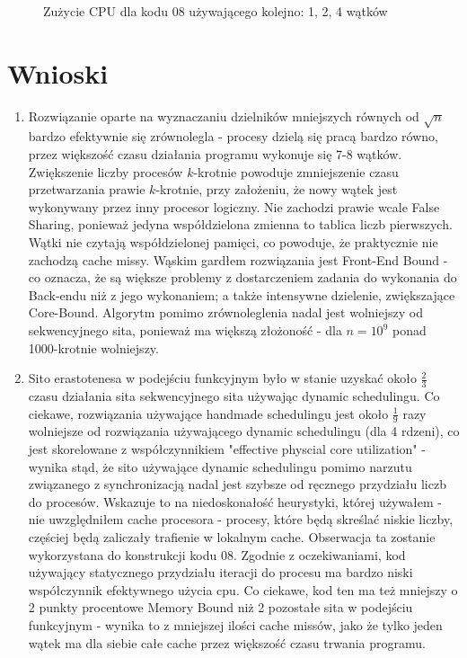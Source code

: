 \documentclass[12pt]{article}
\begin{document}
\begin{figure}[h!]
\begin{subfigure}[b]{0.32\linewidth}
	\end{subfigure}
	\caption{Zużycie CPU dla kodu 08 używającego kolejno: 1, 2, 4 wątków}
\end{figure}

\section{Wnioski}
\begin{enumerate}
	\item Rozwiązanie oparte na wyznaczaniu dzielników mniejszych równych od \(\sqrt{n}\) bardzo efektywnie się zrównolegla - procesy dzielą się pracą bardzo równo, przez większość czasu działania programu wykonuje się 7-8 wątków. Zwiększenie liczby procesów \(k\)-krotnie powoduje zmniejszenie czasu przetwarzania prawie \(k\)-krotnie, przy założeniu, że nowy wątek jest wykonywany przez inny procesor logiczny. Nie zachodzi prawie wcale False Sharing, ponieważ jedyna współdzielona zmienna to tablica liczb pierwszych. Wątki nie czytają współdzielonej pamięci, co powoduje, że praktycznie nie zachodzą cache missy. Wąskim gardłem rozwiązania jest Front-End Bound - co oznacza, że są większe problemy z dostarczeniem zadania do wykonania do Back-endu niż z jego wykonaniem; a także intensywne dzielenie, zwiększające Core-Bound. Algorytm pomimo zrównoleglenia nadal jest wolniejszy od sekwencyjnego sita, ponieważ ma większą złożoność - dla \(n=10^9\) ponad 1000-krotnie wolniejszy.
	
	\item Sito erastotenesa w podejściu funkcyjnym było w stanie uzyskać około \(\frac{2}{3}\) czasu działania sita sekwencyjnego sita używając dynamic schedulingu. Co ciekawe, rozwiązania używające handmade schedulingu jest około \(\frac{1}{9}\) razy wolniejsze od rozwiązania używającego dynamic schedulingu (dla 4 rdzeni), co jest skorelowane z współczynnikiem "effective physcial core utilization" - wynika stąd, że sito używające dynamic schedulingu pomimo narzutu związanego z synchronizacją nadal jest szybsze od ręcznego przydziału liczb do procesów. Wskazuje to na niedoskonałość heurystyki, której używałem - nie uwzględniłem cache procesora - procesy, które będą skreślać niskie liczby, częściej będą zaliczały trafienie w lokalnym cache. Obserwacja ta zostanie wykorzystana do konstrukcji kodu 08. Zgodnie z oczekiwaniami, kod używający statycznego przydziału iteracji do procesu ma bardzo niski współczynnik efektywnego użycia cpu. Co ciekawe, kod ten ma też mniejszy o 2 punkty procentowe Memory Bound niż 2 pozostałe sita w podejściu funkcyjnym - wynika to z mniejszej ilości cache missów, jako że tylko jeden wątek ma dla siebie całe cache przez większość czasu trwania programu.
	

\end{enumerate}
\end{document}
